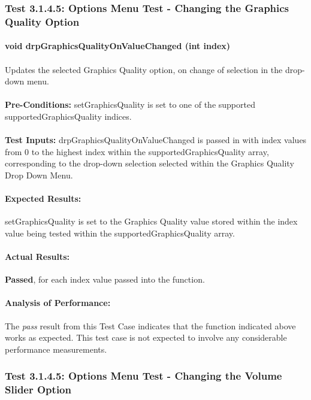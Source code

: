 \documentclass{article}
\begin{document}
    \subsubsection{Test 3.1.4.5: Options Menu Test - Changing the Graphics Quality Option}
    \paragraph{}\textbf{void drpGraphicsQualityOnValueChanged (int index)}
    \paragraph{} Updates the selected Graphics Quality option, on change of selection in the drop-down menu.
    \paragraph{}\textbf{Pre-Conditions:} setGraphicsQuality is set to one of the supported supportedGraphicsQuality indices.
    \paragraph{}\textbf{Test Inputs:} drpGraphicsQualityOnValueChanged is passed in with index values from 0 to the highest index within the supportedGraphicsQuality array, corresponding to the drop-down selection selected within the Graphics Quality Drop Down Menu.
    \paragraph{Expected Results:} setGraphicsQuality is set to the Graphics Quality value stored within the index value being tested within the supportedGraphicsQuality array.
    \paragraph{Actual Results:} \textbf{Passed}, for each index value passed into the function.
    \paragraph{Analysis of Performance:} The \emph{pass} result from this Test Case indicates that the function indicated above works as expected. This test case is not expected to involve any considerable performance measurements.
    
    \subsubsection{Test 3.1.4.5: Options Menu Test - Changing the Volume Slider Option}
\end{document}
